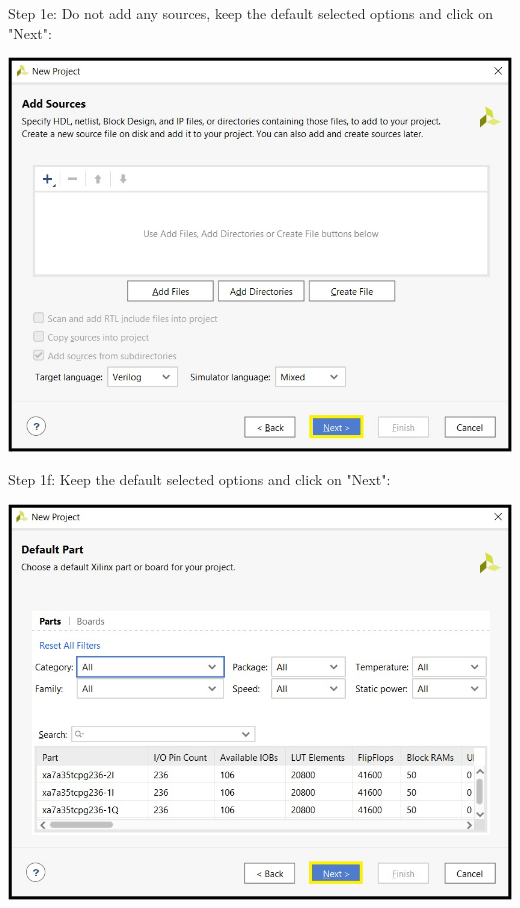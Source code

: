 \begin{minipage}{\linewidth}
  Step 1e: Do not add any sources, keep the default selected options and click on "Next": \\
  \begin{center}
    \includegraphics[width=0.7\linewidth]{images/vivado01e.png}
  \end{center}
\end{minipage}

\vspace{5mm}

\begin{minipage}{\linewidth}
  Step 1f: Keep the default selected options and click on "Next": \\
  \begin{center}
    \includegraphics[width=0.7\linewidth]{images/vivado01f.png}
  \end{center}
\end{minipage}

